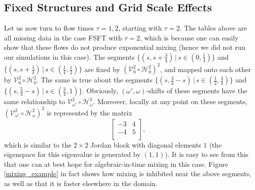 \documentclass[12pt]{article}
\numberwithin{figure}{section}
\numberwithin{equation}{section}
\newcommand{\calH}{{\mathcal{H}}}
\newcommand{\calV}{{\mathcal{V}}}
\begin{document}


%

\subsection{Fixed Structures and Grid Scale Effects}
\label{S3.2}

Let us now turn to flow times $\tau=1,2$, starting with $\tau=2$.  The tables above are all missing data in the case FSFT with $\tau=2$, which is because one can easily show that these flows do not produce exponential mixing (hence we did not run our simulations in this case).  The segments $\{(s,s+\frac 34)\,|\,s\in (0,\frac 14)\}$ and $\{(s,s+\frac 14)\,|\,s\in (\frac 14,\frac 12)\}$ are fixed by $(\calV_{0}^{2} \circ \calH_{0}^{2})^2$, and mapped onto each other by $\calV_{0}^{2} \circ \calH_{0}^{2}$.  The same is true about the segments $\{(s,\frac 34-s)\,|\,s\in (\frac 12,\frac 34)\}$ and $\{(s,\frac 54-s)\,|\,s\in (\frac 34,1)\}$.  Obviously, $(\omega',\omega)$-shifts of these segments have the same relationship to $\calV_{\omega'}^{2} \circ \calH_{\omega}^{2}$.  Moreover, locally at any point on these segments, $(\calV_{\omega'}^{2} \circ \calH_{\omega}^{2})^2$ is represented by the matrix 
\[
\begin{bmatrix}
            -3 & 4 \\
            -4 & 5 \\
\end{bmatrix},
\]
which is similar to the $2\times 2$ Jordan block with diagonal elements $1$ (the eigenspace for this eigenvalue is generated by $(1,1)$).  It is easy to see from this that one can  at best hope for algebraic-in-time mixing in this case.  Figure \ref{mixing_example} in fact shows how mixing is inhibited near the above segments, as well as that it is faster elsewhere in the domain.
\end{document}
